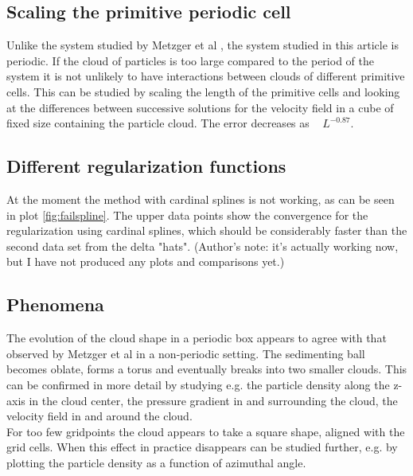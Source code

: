 \documentclass[a4paper,twoside=false,abstract=false,numbers=noenddot,
titlepage=false,headings=small,parskip=half,version=last]{scrartcl}
\begin{document}
\subsection{Scaling the primitive periodic cell}\label{cellscale}
Unlike the system studied by Metzger et al \cite{fallingclouds}, the system studied in this article is periodic. If the cloud of particles is too large compared to the period of the system it is not unlikely to have interactions between clouds of different primitive cells. This can be studied by scaling the length of the primitive cells and looking at the differences between successive solutions for the velocity field in a cube of fixed size containing the particle cloud. The error decreases as ~ $L^{-0.87}$.

\subsection{Different regularization functions}
At the moment the method with cardinal splines is not working, as can be seen in plot \ref{fig:failspline}. The upper data points show the convergence for the regularization using cardinal splines, which should be considerably faster than the second data set from the delta "hats". (Author's note: it's actually working now, but I have not produced any plots and comparisons yet.)

\subsection{Phenomena}
The evolution of the cloud shape in a periodic box appears to agree with that observed by Metzger et al \cite{fallingclouds} in a non-periodic setting. The sedimenting ball becomes oblate, forms a torus and eventually breaks into two smaller clouds. This can be confirmed in more detail by studying e.g. the particle density along the z-axis in the cloud center, the pressure gradient in and surrounding the cloud, the velocity field in and around the cloud.\\
For too few gridpoints the cloud appears to take a square shape, aligned with the grid cells. When this effect in practice disappears can be studied further, e.g. by plotting the particle density as a function of azimuthal angle.\\
\end{document}

